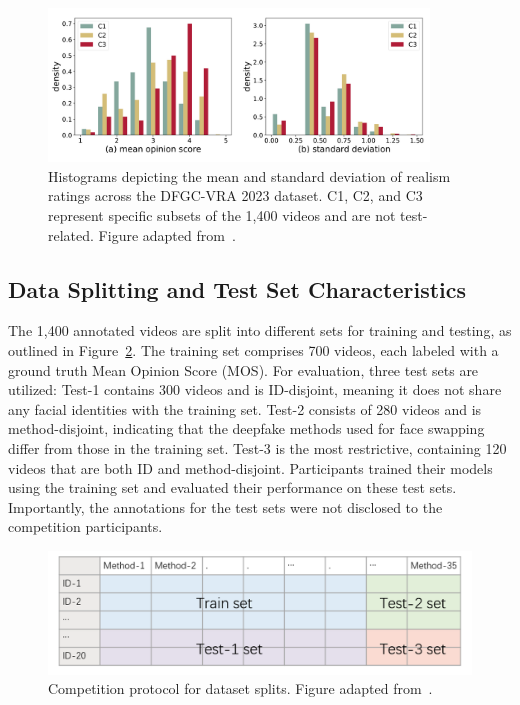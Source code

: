 \documentclass[a4paper,12pt,openright]{book}
\begin{document}
\begin{figure}[!htb]
    \centering
    \includegraphics[trim={1cm 1cm 0cm 0cm},clip,width=0.9\textwidth]{images/mos-lines-scale-1000-gigapixel.png}
    \caption{Histograms depicting the mean and standard deviation of realism ratings across the DFGC-VRA 2023 dataset. C1, C2, and C3 represent specific subsets of the 1,400 videos and are not test-related. Figure adapted from~\cite{sun2023visual}.}
    \label{fig:MOS_distribution}
\end{figure}

\newpage
\subsection{Data Splitting and Test Set Characteristics}

The 1,400 annotated videos are split into different sets for training and testing, as outlined in Figure~\ref{fig:data_splitting}. The training set comprises 700 videos, each labeled with a ground truth Mean Opinion Score (MOS). For evaluation, three test sets are utilized: Test-1 contains 300 videos and is ID-disjoint, meaning it does not share any facial identities with the training set. Test-2 consists of 280 videos and is method-disjoint, indicating that the deepfake methods used for face swapping differ from those in the training set. Test-3 is the most restrictive, containing 120 videos that are both ID and method-disjoint. Participants trained their models using the training set and evaluated their performance on these test sets. Importantly, the annotations for the test sets were not disclosed to the competition participants.

\begin{figure}[H]
    \centering
    \includegraphics[trim={0.6cm 0cm 0.6cm 0cm},clip,width=\textwidth]{images/protocol.png}
    \caption{Competition protocol for dataset splits. Figure adapted from~\cite{peng_etal_2023}.}
    \label{fig:data_splitting}
\end{figure}
\end{document}
